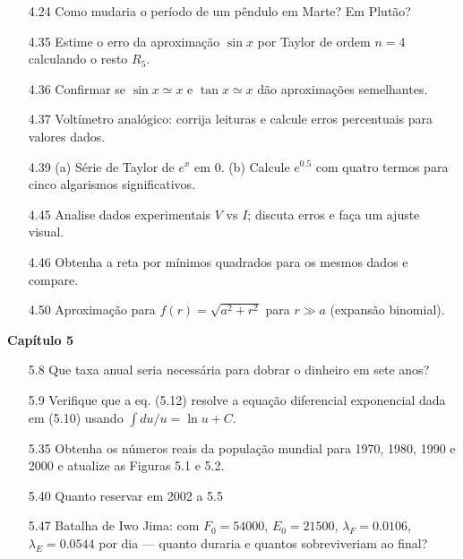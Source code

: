 \begin{enumerate}
  \item[4.24] Como mudaria o período de um pêndulo em Marte? Em Plutão?
  \item[4.35] Estime o erro da aproximação $\sin x$ por Taylor de ordem $n=4$ calculando o resto $R_5$.
  \item[4.36] Confirmar se $\sin x \simeq x$ e $\tan x \simeq x$ dão aproximações semelhantes.
  \item[4.37] Voltímetro analógico: corrija leituras e calcule erros percentuais para valores dados.
  \item[4.39] (a) Série de Taylor de $e^x$ em $0$. (b) Calcule $e^{0.5}$ com quatro termos para cinco algarismos significativos.
  \item[4.45] Analise dados experimentais $V$ vs $I$; discuta erros e faça um ajuste visual.
  \item[4.46] Obtenha a reta por mínimos quadrados para os mesmos dados e compare.
  \item[4.50] Aproximação para $f(r)=\sqrt{a^2+r^2}$ para $r\gg a$ (expansão binomial).
\end{enumerate}

\textbf{Capítulo 5}
\begin{enumerate}
  \item[5.8] Que taxa anual seria necessária para dobrar o dinheiro em sete anos?
  \item[5.9] Verifique que a eq. (5.12) resolve a equação diferencial exponencial dada em (5.10) usando $\int du/u = \ln u + C$.
  \item[5.35] Obtenha os números reais da população mundial para 1970, 1980, 1990 e 2000 e atualize as Figuras 5.1 e 5.2.
  \item[5.40] Quanto reservar em 2002 a 5.5%
  \item[5.47] Batalha de Iwo Jima: com $F_0=54000$, $E_0=21500$, $\lambda_F=0.0106$, $\lambda_E=0.0544$ por dia — quanto duraria e quantos sobreviveriam ao final?
\end{enumerate}
